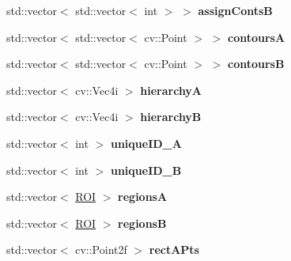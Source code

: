 \begin{DoxyCompactItemize}
\item 
std\+::vector$<$ std\+::vector$<$ int $>$ $>$ {\bfseries assign\+ContsB}\hypertarget{structStereoContainer_ad2f2d6f672b46b48f8f0fe54fecd841e}{}\label{structStereoContainer_ad2f2d6f672b46b48f8f0fe54fecd841e}

\item 
std\+::vector$<$ std\+::vector$<$ cv\+::\+Point $>$ $>$ {\bfseries contoursA}\hypertarget{structStereoContainer_abce6cd9d674049291fbaee626ffc11d3}{}\label{structStereoContainer_abce6cd9d674049291fbaee626ffc11d3}

\item 
std\+::vector$<$ std\+::vector$<$ cv\+::\+Point $>$ $>$ {\bfseries contoursB}\hypertarget{structStereoContainer_a4deabb23f07f05d3a5f70bd41a0d6f5b}{}\label{structStereoContainer_a4deabb23f07f05d3a5f70bd41a0d6f5b}

\item 
std\+::vector$<$ cv\+::\+Vec4i $>$ {\bfseries hierarchyA}\hypertarget{structStereoContainer_a6f21eaf75993164c1bb42e014d04e711}{}\label{structStereoContainer_a6f21eaf75993164c1bb42e014d04e711}

\item 
std\+::vector$<$ cv\+::\+Vec4i $>$ {\bfseries hierarchyB}\hypertarget{structStereoContainer_aae64051db8ae5d7e27ff3bd843c049a4}{}\label{structStereoContainer_aae64051db8ae5d7e27ff3bd843c049a4}

\item 
std\+::vector$<$ int $>$ {\bfseries unique\+I\+D\+\_\+A}\hypertarget{structStereoContainer_a62e51fbaf6d7ce036a8fbb629e4410ef}{}\label{structStereoContainer_a62e51fbaf6d7ce036a8fbb629e4410ef}

\item 
std\+::vector$<$ int $>$ {\bfseries unique\+I\+D\+\_\+B}\hypertarget{structStereoContainer_a25c8ecd42de1d5eb3a23dad137e8e6f7}{}\label{structStereoContainer_a25c8ecd42de1d5eb3a23dad137e8e6f7}

\item 
std\+::vector$<$ \hyperlink{structROI}{R\+OI} $>$ {\bfseries regionsA}\hypertarget{structStereoContainer_a98a1309259ddb94a521f6084676ae50a}{}\label{structStereoContainer_a98a1309259ddb94a521f6084676ae50a}

\item 
std\+::vector$<$ \hyperlink{structROI}{R\+OI} $>$ {\bfseries regionsB}\hypertarget{structStereoContainer_a84e298fc6f43b03cad6c42c9c169cda5}{}\label{structStereoContainer_a84e298fc6f43b03cad6c42c9c169cda5}

\item 
std\+::vector$<$ cv\+::\+Point2f $>$ {\bfseries rect\+A\+Pts}\hypertarget{structStereoContainer_afe98368b5ea13b0b09a5a8c7cdfc272a}{}\label{structStereoContainer_afe98368b5ea13b0b09a5a8c7cdfc272a}


\end{DoxyCompactItemize}
